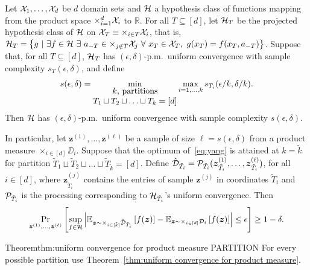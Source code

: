 \begin{theorem}\label{thm:uniform convergence for product measure PARTITION}
Let ${\mathcal{X}}_1,\ldots, {\mathcal{X}}_d$ be $d$ domain sets and ${\mathcal{H}}$ a hypothesis class of functions mapping from the product space $\times_{i=1}^{d} {\mathcal{X}}_i$ to $\mathbb{R}$. For all $T\subseteq [d]$, let ${\mathcal{H}}_T$ be the projected hypothesis class of ${\mathcal{H}}$ on ${\mathcal{X}}_T \equiv \times_{i \in T}{\mathcal{X}}_i$, that is, $\HH_T=\left\{g\ |\ \exists f\in \HH\ \exists\ a_{-T}\in \times_{j\notin T} \XX_j \ \forall\ x_T\in \XX_T, \ g(x_T) = f(x_T,a_{-T})\right\}$. Suppose that, for all $T \subseteq [d]$, ${\mathcal{H}}_T$ has $(\epsilon,\delta)$-p.m.~uniform convergence with sample complexity $s_T(\epsilon,\delta)$, and define 
\begin{align}s(\epsilon,\delta) = \min_{\begin{minipage}[h]{3.5cm}\centering $k$,~partitions\\$T_1 \sqcup T_2 \sqcup \ldots \sqcup T_k = [d]$\end{minipage}} \max_{i=1,\ldots,k} s_{T_i}(\epsilon/k,\delta/k). \label{eq:yang}
\end{align}
Then ${\mathcal{H}}$ has $(\epsilon,\delta)$-p.m.~uniform convergence with sample complexity $s(\epsilon,\delta)$.

In particular, let $\boldsymbol{z}^{(1)},\ldots, \boldsymbol{z}^{(\ell)}$ be a sample of size $\ell = s(\epsilon,\delta)$ from a product measure $\times_{i\in[d]} \DD_i$. Suppose that the optimum of~\eqref{eq:yang} is attained at $k=\tilde{k}$ for partition $\tilde{T}_1 \sqcup \tilde{T}_2 \sqcup \ldots \sqcup \tilde{T}_{\tilde{k}} = [d]$. Define $\hat{{\mathcal{D}}}_{\tilde{T}_i} = {\cal P}_{\tilde{T}_i}({\boldsymbol{z}}^{(1)}_{\tilde{T}_i},\ldots,{\boldsymbol{z}}^{(\ell)}_{\tilde{T}_i})$, for all $i\in[d]$,  where ${\boldsymbol{z}}^{(j)}_{\tilde{T}_i}$ contains the entries of sample $\boldsymbol{z}^{(j)}$ in coordinates $\tilde{T}_i$ and ${\cal P}_{\tilde{T}_i}$ is the processing corresponding to ${\mathcal{H}}_{\tilde{T}_i}$'s uniform convergence. Then 
$$\Pr_{\boldsymbol{z}^{(1)},\ldots, \boldsymbol{z}^{(\ell)}}\left[\sup_{f\in {\mathcal{H}}}\left|{\mathbb{E}}_{\boldsymbol{z}\sim \times_{i\in[\tilde{k}]}\hat{{\mathcal{D}}}_{\tilde{T}_i}}\left[f(\boldsymbol{z})\right] - {\mathbb{E}}_{\boldsymbol{z}\sim \times_{i\in[d]}{{\mathcal{D}}}_i}\left[f(\boldsymbol{z})\right]\right|\leq \epsilon\right]\geq 1-\delta.$$


\end{theorem}
\begin{prevproof}{Theorem}{thm:uniform convergence for product measure PARTITION}
For every possible partition use Theorem~\ref{thm:uniform convergence for product measure}.
\end{prevproof}


